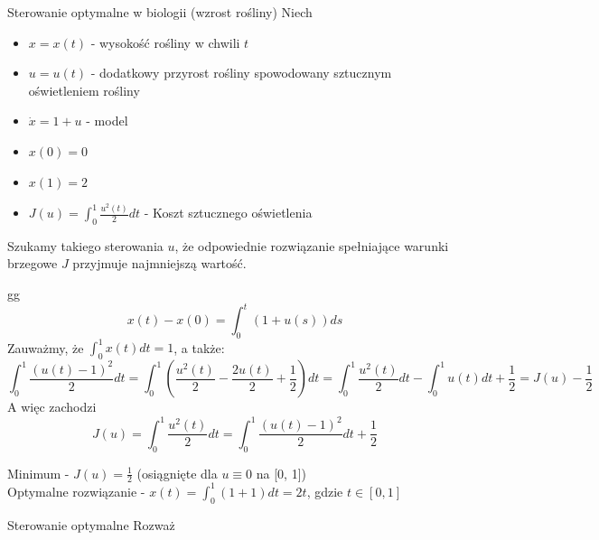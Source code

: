 \begin{example}{Sterowanie optymalne w biologii (wzrost rośliny)}{}{}
    Niech \begin{itemize}
        \item $x = x(t)$ - wysokość rośliny w chwili $t$
        \item $u = u(t)$ - dodatkowy przyrost rośliny spowodowany sztucznym oświetleniem rośliny
        \item $\dot{x} = 1 + u$ - model
        \item $x(0) = 0$
        \item $x(1) = 2$
        \item $J(u) = \int_0^1 \frac{u^2(t)}{2} dt$ - Koszt sztucznego oświetlenia
    \end{itemize}
    Szukamy takiego sterowania $u$, że odpowiednie rozwiązanie spełniające warunki brzegowe $J$ przyjmuje najmniejszą wartość.

    \begin{solution}{}{}{}gg
        $$x(t) - x(0) = \int^t_0 (1 + u(s)) ds$$
        Zauważmy, że $\int^1_0 x(t) dt = 1$, a także:
        \[\int^1_0 \frac{(u(t) - 1)^2}{2} dt = \int^1_0 (\frac{u^2(t)}{2} - \frac{2 u(t)}{2} + \frac{1}{2}) dt = \int^1_0 \frac{u^2(t)}{2} dt - \int^1_0 u(t) dt + \frac{1}{2} = J(u) - \frac{1}{2}\]
        A więc zachodzi \[J(u) = \int_0^1 \frac{u^2(t)}{2} dt = \int^1_0 \frac{(u(t) - 1)^2}{2} dt + \frac{1}{2}\]
    \end{solution}

    Minimum - $J(u) = \frac{1}{2}$ (osiągnięte dla $u \equiv 0$ na [0, 1]) \\
    Optymalne rozwiązanie - $x(t) = \int^1_0 (1 + 1) dt = 2t$, gdzie $t \in [0, 1]$
\end{example}

\begin{definition}{Sterowanie optymalne}{}
    Rozważ
\end{definition}
